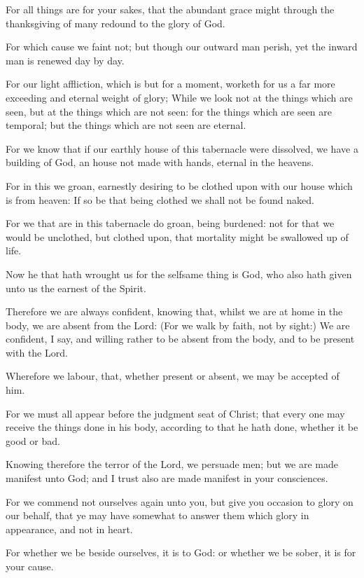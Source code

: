 \Verse For all things are for your sakes, that the abundant grace might through the thanksgiving of many redound to the glory of God.

\Verse For which cause we faint not; but though our outward man perish, yet the inward man is renewed day by day.

\Verse For our light affliction, which is but for a moment, worketh for us a far more exceeding and eternal weight of glory; \Verse While we look not at the things which are seen, but at the things which are not seen: for the things which are seen are temporal; but the things which are not seen are eternal.


\Chapter
\Verse For we know that if our earthly house of this tabernacle were dissolved, we have a building of God, an house not made with hands, eternal in the heavens.

\Verse For in this we groan, earnestly desiring to be clothed upon with our house which is from heaven: \Verse If so be that being clothed we shall not be found naked.

\Verse For we that are in this tabernacle do groan, being burdened: not for that we would be unclothed, but clothed upon, that mortality might be swallowed up of life.

\Verse Now he that hath wrought us for the selfsame thing is God, who also hath given unto us the earnest of the Spirit.

\Verse Therefore we are always confident, knowing that, whilst we are at home in the body, we are absent from the Lord: \Verse (For we walk by faith, not by sight:) \Verse We are confident, I say, and willing rather to be absent from the body, and to be present with the Lord.

\Verse Wherefore we labour, that, whether present or absent, we may be accepted of him.

\Verse For we must all appear before the judgment seat of Christ; that every one may receive the things done in his body, according to that he hath done, whether it be good or bad.

\Verse Knowing therefore the terror of the Lord, we persuade men; but we are made manifest unto God; and I trust also are made manifest in your consciences.

\Verse For we commend not ourselves again unto you, but give you occasion to glory on our behalf, that ye may have somewhat to answer them which glory in appearance, and not in heart.

\Verse For whether we be beside ourselves, it is to God: or whether we be sober, it is for your cause.

